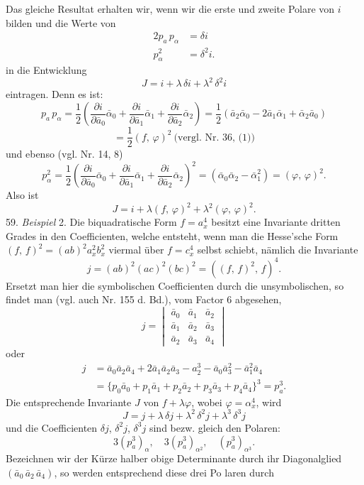 Das gleiche Resultat erhalten wir, wenn wir die erste und zweite
Polare von $i$ bilden und die Werte von
\[
\begin{aligned}
2p_a\,p_\alpha &= \delta i\\
p_\alpha^2 &= \delta^2 i.
\end{aligned}
\]
in die Entwicklung
\[
J = i + \lambda\,\delta i + \lambda^2\,\delta^2 i
\]
eintragen. Denn es ist:
\[
p_a\,p_\alpha = \frac{1}{2}\left(\frac{\partial i}{\partial \bar a_0}\bar\alpha_0+\frac{\partial i}{\partial \bar a_1}\bar\alpha_1+\frac{\partial i}{\partial \bar a_2}\bar\alpha_2\right) = \frac{1}{2}(\bar a_2\bar\alpha_0-2\bar a_1\bar\alpha_1+\bar\alpha_2\bar a_0)
\]
\[
= \frac{1}{2}(f,\,\varphi)^2 \ \text{(vergl. Nr. 36, (1))}
\]
und ebenso (vgl. Nr. 14, 8)
\[
p_\alpha^2 = \frac{1}{2}\left(\frac{\partial i}{\partial \bar a_0}\bar\alpha_0+\frac{\partial i}{\partial \bar a_1}\bar\alpha_1+\frac{\partial i}{\partial \bar a_2}\bar\alpha_2\right)^2 = (\bar\alpha_0\bar\alpha_2-\bar\alpha_1^2) = (\varphi,\,\varphi)^2.
\]
Also ist
\[
J = i + \lambda(f,\,\varphi)^2 + \lambda^2(\varphi,\,\varphi)^2.
\]
59. \textit{Beispiel} 2. Die biquadratische Form $f=a_x^4$ besitzt eine In\-variante dritten Grades in den Coefficienten, welche entsteht, wenn
man die Hesse'sche Form $(f,\,f)^2=(ab)^2a_x^2b_x^2$ viermal über $f=c_x^4$
selbst schiebt, nämlich die Invariante
\[
j = (ab)^2(ac)^2(bc)^2 = ((f,\,f)^2,\,f)^4.
\]
Ersetzt man hier die symbolischen Coefficienten durch die unsymbo\-lischen, so findet man (vgl. auch Nr. 155 d. Bd.), vom Factor 6 abge\-sehen,
\[
j = \begin{vmatrix} \bar a_0 & \bar a_1 & \bar a_2\\ \bar a_1 & \bar a_2 & \bar a_3\\ \bar a_2 & \bar a_3 & \bar a_4 \end{vmatrix}
\]
oder
\[
\begin{aligned}
j &= \bar a_0\bar a_2\bar a_4 + 2\bar a_1\bar a_2\bar a_3 - a_2^3 - \bar a_0\bar a_3^2 - \bar a_1^2\bar a_4 %
\\
&= \{p_0\bar a_0+p_1\bar a_1+p_2\bar a_2+p_3\bar a_3+p_4\bar a_4\}^3 = p_a^3.
\end{aligned}
\]
Die entsprechende Invariante $J$ von $f+\lambda\varphi$, wobei $\varphi=\alpha_x^4$, wird
\[
J = j + \lambda\,\delta j + \lambda^2\,\delta^2 j + \lambda^3\,\delta^3 j
\]
und die Coefficienten $\delta j$, $\delta^2 j$, $\delta^3 j$ sind bezw. gleich den Polaren:
\[
3(p_a^3)_\alpha,\quad 3(p_a^3)_{\alpha^2},\quad (p_a^3)_{\alpha^3}.
\]
Bezeichnen wir der Kürze halber obige Determinante durch
ihr Diagonalglied $(\bar a_0\,\bar a_2\,\bar a_4)$, so werden entsprechend diese drei Po\-
laren durch


